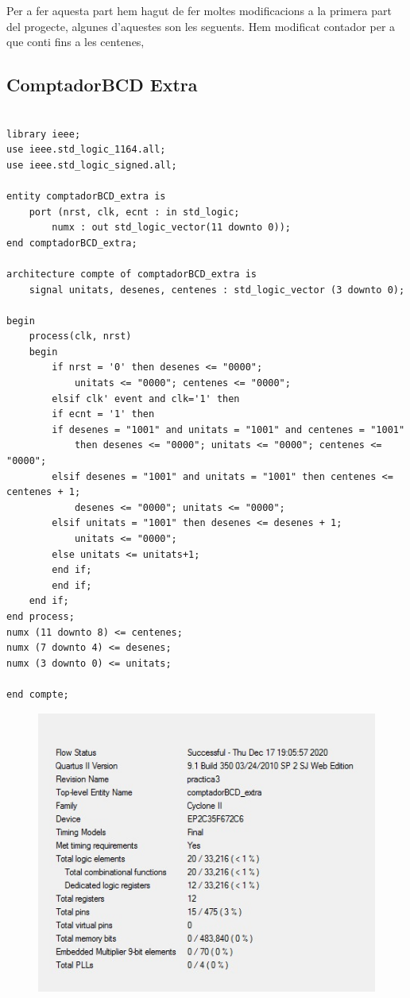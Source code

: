 \documentclass[12pt, a4papre]{article}
\begin{document}
Per a fer aquesta part hem hagut de fer moltes modificacions a la primera part del progecte, algunes d'aquestes son les seguents. Hem modificat contador per a que conti fins a les centenes, 

\subsection{ComptadorBCD Extra}

	\begin{lstlisting}[style=vhdl, frame=single, basicstyle=\tiny]

library ieee;
use ieee.std_logic_1164.all;
use ieee.std_logic_signed.all;

entity comptadorBCD_extra is
	port (nrst, clk, ecnt : in std_logic;
		numx : out std_logic_vector(11 downto 0));
end comptadorBCD_extra;

architecture compte of comptadorBCD_extra is 
	signal unitats, desenes, centenes : std_logic_vector (3 downto 0);
	
begin 
	process(clk, nrst)
	begin
	    if nrst = '0' then desenes <= "0000";
			unitats <= "0000"; centenes <= "0000";
	    elsif clk' event and clk='1' then
		if ecnt = '1' then
		if desenes = "1001" and unitats = "1001" and centenes = "1001" 
			then desenes <= "0000"; unitats <= "0000"; centenes <= "0000";
		elsif desenes = "1001" and unitats = "1001" then centenes <= centenes + 1;
			desenes <= "0000"; unitats <= "0000";
		elsif unitats = "1001" then desenes <= desenes + 1;
			unitats <= "0000";
		else unitats <= unitats+1;
		end if;
	    end if;
	end if;
end process;
numx (11 downto 8) <= centenes;
numx (7 downto 4) <= desenes;
numx (3 downto 0) <= unitats;

end compte;

		\end{lstlisting}
		
				\begin{figure}[H]
		\begin{center}
		\includegraphics[width=130mm]{informeComptadorBCDextra.jpeg}
		\end{center}
	\end{figure}	
		
\end{document}
